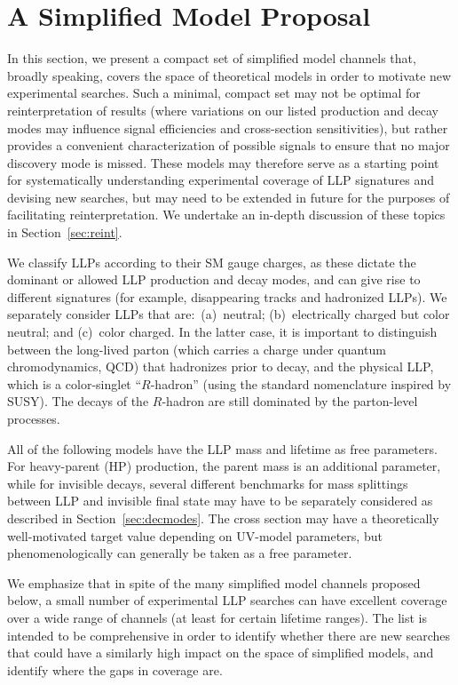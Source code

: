 \section{A Simplified Model Proposal}\label{sec:proposal}

In this section, we present a compact set of simplified model channels that, broadly speaking, covers the space of theoretical models in order to motivate new experimental searches.
Such a minimal, compact set may not be optimal for reinterpretation of results (where variations on our listed production and decay modes may influence signal efficiencies and cross-section sensitivities), but rather provides a convenient characterization of possible signals to ensure that no major discovery mode is missed.
These models may therefore serve as a starting point for systematically understanding experimental coverage of LLP signatures and devising new searches, but may need to be extended in future for the purposes of facilitating reinterpretation.
We undertake an in-depth discussion of these topics in Section~\ref{sec:reint}.

We classify LLPs according to their SM gauge charges, as these dictate the dominant or allowed LLP production and decay modes, and can give rise to different signatures (for example, disappearing tracks and hadronized LLPs).
We separately consider LLPs that are:~(a)~neutral; (b)~electrically charged but color neutral; and (c)~color charged.
In the latter case, it is important to distinguish between the long-lived parton (which carries a charge under quantum chromodynamics, QCD) that hadronizes prior to decay, and the physical LLP, which is a color-singlet ``$R$-hadron'' (using the standard nomenclature inspired by SUSY).
The decays of the $R$-hadron are still dominated by the parton-level processes.

All of the following models have the LLP mass and lifetime as free parameters.
For heavy-parent (HP) production, the parent mass is an additional parameter, while for invisible decays, several different benchmarks for mass splittings between LLP and invisible final state may have to be separately considered as described in Section~\ref{sec:decmodes}.
The cross section may have a theoretically well-motivated target value depending on UV-model parameters, but phenomenologically can generally be taken as a free parameter.

We emphasize that in spite of the many simplified model channels proposed below, a small number of experimental LLP searches can have excellent coverage over a wide range of channels (at least for certain lifetime ranges).
The list is intended to be comprehensive in order to identify whether there are new searches that could have a similarly high impact on the space of simplified models, and identify where the gaps in coverage are.

